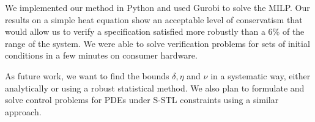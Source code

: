 \documentclass[letterpaper, 10 pt, conference]{ieeeconf/ieeeconf}
\begin{document}
We implemented our method in Python and used Gurobi to solve the MILP. Our
results on a simple heat equation show an acceptable level of conservatism that
would allow us to verify a specification satisfied more robustly than a 6\% of the range of
the system. We were able to solve verification problems for sets of initial conditions in a
few minutes on consumer hardware.

As future work, we want to find the bounds $\delta, \eta$ and $\nu$ in a
systematic way, either analytically or using a robust statistical method. We
also plan to formulate and solve control problems for PDEs under S-STL constraints
using a similar approach.



\end{document}

